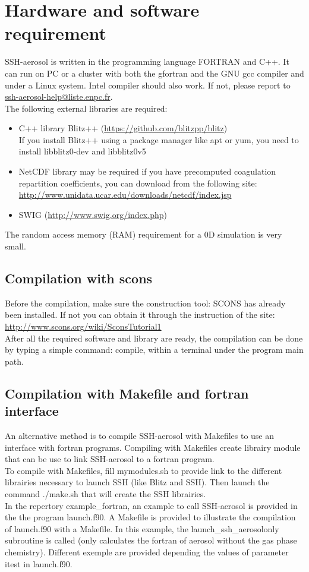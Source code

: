 \documentclass[a4paper,11pt]{article}
\begin{document}
\section*{Hardware and software requirement}
SSH-aerosol is written in the programming language FORTRAN and C++. It can run on PC or a cluster with both the gfortran and the GNU gcc compiler and under a Linux system. Intel compiler should also work. If not, please report to  \url{ssh-aerosol-help@liste.enpc.fr}.\\

The following external libraries are required:
\begin{itemize}
\item C++ library Blitz++ (\url{https://github.com/blitzpp/blitz}) \\
  If you install Blitz++ using a package manager like apt or yum, you need to install libblitz0-dev and libblitz0v5
\item NetCDF library may be required if you have precomputed coagulation repartition coefficients, you can download from the following site:
\url{http://www.unidata.ucar.edu/downloads/netcdf/index.jsp}
\item SWIG (\url{http://www.swig.org/index.php})
\end{itemize}
The random access memory (RAM) requirement for a 0D simulation is very small. 

\subsection{Compilation with scons}

Before the compilation, make sure the construction tool: SCONS has already been installed. 
If not you can obtain it through the instruction of the site: \url{http://www.scons.org/wiki/SconsTutorial1}\\

After all the required software and library are ready, the compilation can be done by typing a simple command: compile, within a terminal under the program main path.

\subsection{Compilation with Makefile and fortran interface}

An alternative method is to compile SSH-aerosol with Makefiles to use an interface with fortran programs. Compiling with Makefiles create librairy module that can be use to link SSH-aerosol to a fortran program.\\
To compile with Makefiles, fill mymodules.sh to provide link to the different librairies necessary to launch SSH (like Blitz and SSH). Then launch the command ./make.sh that will create the SSH librairies.\\
In the repertory example\_fortran, an example to call SSH-aerosol is provided in the the program launch.f90. A Makefile is provided to illustrate the compilation of launch.f90 with a Makefile. In this example, the launch\_ssh\_aerosolonly subroutine is called (only calculates the fortran of aerosol without the gas phase chemistry). Different exemple are provided depending the values of parameter itest in launch.f90.
\end{document}
